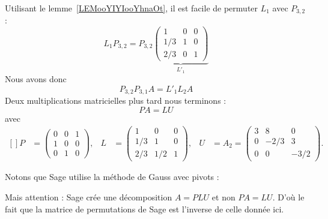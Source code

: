 \begin{example}
    Utilisant le lemme~\ref{LEMooYIYIooYhnaOt}, il est facile de permuter \( L_{1}\) avec \( P_{3,2}\) :
    \begin{equation}
        L_1P_{3,2}=P_{3,2}
        \underbrace{
        \begin{pmatrix}
            1    &   0    &   0    \\
            1/3    &   1    &   0    \\
            2/3    &   0    &   1
        \end{pmatrix}}_{L'_1}
    \end{equation}
    Nous avons donc
    \begin{equation}
        P_{3,2}P_{3,1}A=L'_1L_2A
    \end{equation}
    Deux multiplications matricielles plus tard nous terminons :
    \begin{equation}
        PA=LU
    \end{equation}
    avec
    \begin{equation}
        \begin{aligned}[]
        P&=\begin{pmatrix}
            0    &   0    &   1    \\
            1    &   0    &   0    \\
            0    &   1    &   0
        \end{pmatrix},&
        L&=\begin{pmatrix}
            1    &   0    &   0    \\
            1/3    &   1    &   0    \\
            2/3    &   1/2    &   1
        \end{pmatrix},&
        U&=A_2=\begin{pmatrix}
            3    &   8    &   0    \\
            0    &   -2/3    &   3    \\
            0    &   0    &   -3/2
        \end{pmatrix}.
        \end{aligned}
    \end{equation}
\end{example}

Notons que Sage utilise la méthode de Gauss avec pivots :

Mais attention : Sage crée une décomposition \( A=PLU\) et non \( PA=LU\). D'où le fait que la matrice de permutations de Sage est l'inverse de celle donnée ici.

